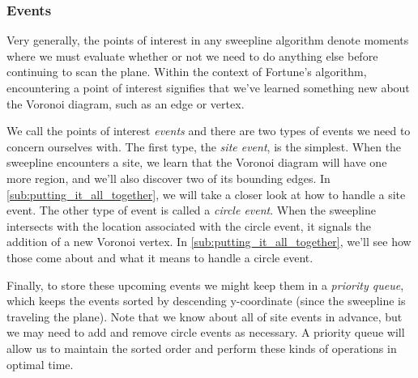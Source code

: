 \documentclass[12pt,twoside]{reedthesis}
\begin{document}
      \subsubsection{Events} %
      \label{ssub:events}
        Very generally, the points of interest in any sweepline algorithm denote moments where we must evaluate whether or not we need to do anything else before continuing to scan the plane. Within the context of Fortune's algorithm, encountering a point of interest signifies that we've learned something new about the Voronoi diagram, such as an edge or vertex. \par

        We call the points of interest \emph{events} and there are two types of events we need to concern ourselves with. The first type, the \emph{site event}, is the simplest. When the sweepline encounters a site, we learn that the Voronoi diagram will have one more region, and we'll also discover two of its bounding edges. In \cref{sub:putting_it_all_together}, we will take a closer look at how to handle a site event. The other type of event is called a \emph{circle event}. When the sweepline intersects with the location associated with the circle event, it signals the addition of a new Voronoi vertex. In \cref{sub:putting_it_all_together}, we'll see how those come about and what it means to handle a circle event.\par

        Finally, to store these upcoming events we might keep them in a \emph{priority queue}, which keeps the events sorted by descending y-coordinate (since the sweepline is traveling  the plane). Note that we know about all of site events in advance, but we may need to add and remove circle events as necessary. A priority queue will allow us to maintain the sorted order and perform these kinds of operations in optimal time. 


\end{document}
